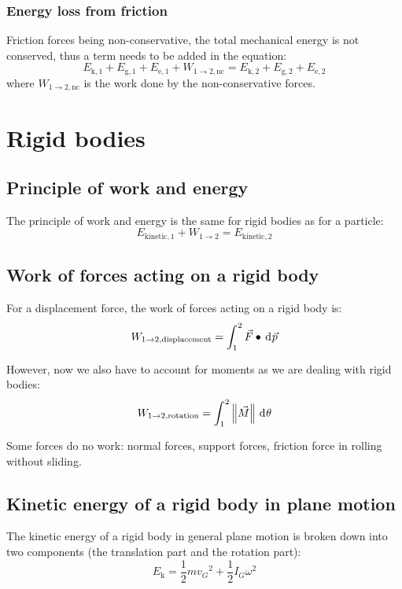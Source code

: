 \documentclass[10pt, twocolumn]{article}
\begin{document}
\subsubsection{Energy loss from friction}
Friction forces being non-conservative, the total mechanical energy is not conserved, thus a term needs to be added in the equation:
\[
  E_\mathrm{k,1} + E_\mathrm{g,1} + E_\mathrm{e,1} + W_\mathrm{1 \to 2, nc} = E_\mathrm{k,2} + E_\mathrm{g,2} + E_\mathrm{e,2}
\]
where \(W_\mathrm{1 \to 2, nc}\) is the work done by the non-conservative forces.


\section{Rigid bodies}
\subsection{Principle of work and energy}
The principle of work and energy is the same for rigid bodies as for a particle:
\[
  E_\mathrm{kinetic,1} + W_{1 \to 2} = E_\mathrm{kinetic,2}
\]

\subsection{Work of forces acting on a rigid body}
For a displacement force, the work of forces acting on a rigid body is:
\[
  W_{1 \to 2,\mathrm{displacement}} = \int_1^2{\vec{F} \bullet \,\mathrm{d}^{} \vec{p}}
\]

However, now we also have to account for moments as we are dealing with rigid bodies:
\[
  W_{1 \to 2,\mathrm{rotation}} = \int_1^2{\left\| \vec{M} \right\| \,\mathrm{d}^{} \theta}
\]

\begin{remark}
  Some forces do no work: normal forces, support forces, friction force in rolling without sliding.
\end{remark}

\subsection{Kinetic energy of a rigid body in plane motion}
The kinetic energy of a rigid body in general plane motion is broken down into two components (the translation part and the rotation part):
\[
  E_\mathrm{k} = \frac{1}{2} m {v_G}^2 + \frac{1}{2} I_G \omega^2
\]
\end{document}
